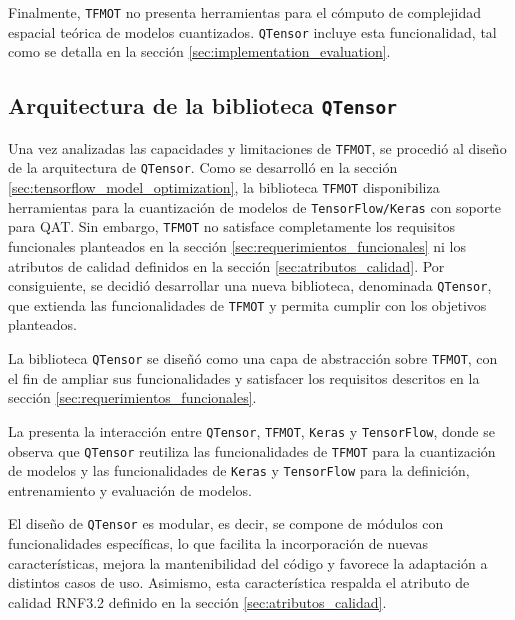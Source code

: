 Finalmente, \texttt{TFMOT} no presenta herramientas para el cómputo de complejidad espacial teórica de modelos cuantizados. \texttt{QTensor} incluye esta funcionalidad, tal como se detalla en la sección \ref{sec:implementation_evaluation}.

\subsection{Arquitectura de la biblioteca \texttt{QTensor}}
\label{sec:implementation_arquitectura}
Una vez analizadas las capacidades y limitaciones de \texttt{TFMOT}, se procedió al diseño de la arquitectura de \texttt{QTensor}. Como se desarrolló en la sección \ref{sec:tensorflow_model_optimization}, la biblioteca \texttt{TFMOT} disponibiliza herramientas para la cuantización de modelos de \texttt{TensorFlow/Keras} con soporte para QAT. Sin embargo, \texttt{TFMOT} no satisface completamente los requisitos funcionales planteados en la sección \ref{sec:requerimientos_funcionales} ni los atributos de calidad definidos en la sección \ref{sec:atributos_calidad}. Por consiguiente, se decidió desarrollar una nueva biblioteca, denominada \texttt{QTensor}, que extienda las funcionalidades de \texttt{TFMOT} y permita cumplir con los objetivos planteados.

La biblioteca \texttt{QTensor} se diseñó como una capa de abstracción sobre \texttt{TFMOT}, con el fin de ampliar sus funcionalidades y satisfacer los requisitos descritos en la sección \ref{sec:requerimientos_funcionales}.

La  presenta la interacción entre \texttt{QTensor}, \texttt{TFMOT}, \texttt{Keras} y \texttt{TensorFlow}, donde se observa que \texttt{QTensor} reutiliza las funcionalidades de \texttt{TFMOT} para la cuantización de modelos y las funcionalidades de \texttt{Keras} y \texttt{TensorFlow} para la definición, entrenamiento y evaluación de modelos.


El diseño de \texttt{QTensor} es modular, es decir, se compone de módulos con funcionalidades específicas, lo que facilita la incorporación de nuevas características, mejora la mantenibilidad del código y favorece la adaptación a distintos casos de uso. Asimismo, esta característica respalda el atributo de calidad RNF3.2 definido en la sección \ref{sec:atributos_calidad}.

